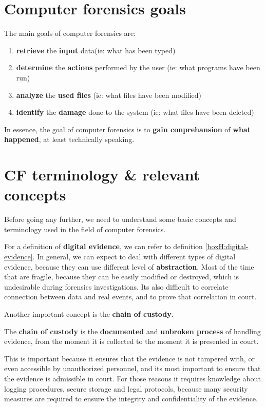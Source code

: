 \section{Computer forensics goals}
The main goals of computer forensics are:
\begin{enumerate}
  \item \textbf{retrieve} the \textbf{input} data(ie: what has been typed)
  \item \textbf{determine} the \textbf{actions} performed by the user (ie: what programs
    have been run)
  \item \textbf{analyze} the \textbf{used files} (ie: what files have been
    modified)
  \item \textbf{identify} the \textbf{damage} done to the system (ie: what
    files have been deleted)
\end{enumerate}
\begin{boxH}
  In essence, the goal of computer forensics is to \textbf{gain conprehansion}
  of \textbf{what happened}, at least technically speaking.
\end{boxH}

\section{CF terminology \& relevant concepts}
Before going any further, we need to understand some basic concepts
and terminology used in the field of computer forensics. 

For a definition of \textbf{digital evidence}, we can refer to
definition \ref{boxH:digital-evidence}. In general, we can expect to
deal with different types of digital evidence, because they can use
different level of \textbf{abstraction}. Most of the time that are
fragile, because they can be easily modified or destroyed, which is
undesirable during forensics investigations. Its also difficult to
correlate connection between data and real events, and to prove that
correlation in court. 

Another important concept is the \textbf{chain of custody}.
\begin{boxH}
  The \textbf{chain of custody} is the \textbf{documented} and
  \textbf{unbroken process} of handling evidence, from the moment it
  is collected to the moment it is presented in court.
\end{boxH}
This is important because it ensures that the evidence is not tampered
with, or even accessible by unauthorized personnel, and its most
important to ensure that the evidence is admissible in court. For
those reasons it requires knowledge about logging procedures, secure
storage and legal protocols, because many security measures are
required to ensure the integrity and confidentiality of the evidence.

